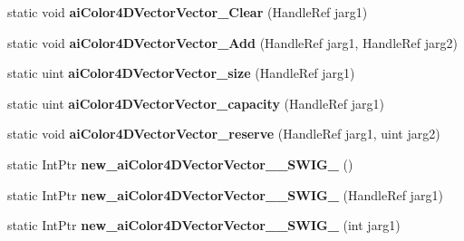\begin{DoxyCompactItemize}
\item 
\hypertarget{class_assimp_p_i_n_v_o_k_e_abc0c2b92adff071874c8415f9f302580}{static void {\bfseries ai\+Color4\+D\+Vector\+Vector\+\_\+\+Clear} (Handle\+Ref jarg1)}\label{class_assimp_p_i_n_v_o_k_e_abc0c2b92adff071874c8415f9f302580}

\item 
\hypertarget{class_assimp_p_i_n_v_o_k_e_a635f5de602db2133e8e3a4ac8884fe9e}{static void {\bfseries ai\+Color4\+D\+Vector\+Vector\+\_\+\+Add} (Handle\+Ref jarg1, Handle\+Ref jarg2)}\label{class_assimp_p_i_n_v_o_k_e_a635f5de602db2133e8e3a4ac8884fe9e}

\item 
\hypertarget{class_assimp_p_i_n_v_o_k_e_a831e99c08fa63c0bd46db32f5596163d}{static uint {\bfseries ai\+Color4\+D\+Vector\+Vector\+\_\+size} (Handle\+Ref jarg1)}\label{class_assimp_p_i_n_v_o_k_e_a831e99c08fa63c0bd46db32f5596163d}

\item 
\hypertarget{class_assimp_p_i_n_v_o_k_e_a56e1670afc099e29889e1e56e362882f}{static uint {\bfseries ai\+Color4\+D\+Vector\+Vector\+\_\+capacity} (Handle\+Ref jarg1)}\label{class_assimp_p_i_n_v_o_k_e_a56e1670afc099e29889e1e56e362882f}

\item 
\hypertarget{class_assimp_p_i_n_v_o_k_e_a30837ce6af17d9b24ce2ce0cb725a1b4}{static void {\bfseries ai\+Color4\+D\+Vector\+Vector\+\_\+reserve} (Handle\+Ref jarg1, uint jarg2)}\label{class_assimp_p_i_n_v_o_k_e_a30837ce6af17d9b24ce2ce0cb725a1b4}

\item 
\hypertarget{class_assimp_p_i_n_v_o_k_e_ae740462f251f4b41cfef8c0f577149a5}{static Int\+Ptr {\bfseries new\+\_\+ai\+Color4\+D\+Vector\+Vector\+\_\+\+\_\+\+S\+W\+I\+G\+\_} ()}\label{class_assimp_p_i_n_v_o_k_e_ae740462f251f4b41cfef8c0f577149a5}

\item 
\hypertarget{class_assimp_p_i_n_v_o_k_e_a33e9eae6a655850ae6a5ec9d1c23d547}{static Int\+Ptr {\bfseries new\+\_\+ai\+Color4\+D\+Vector\+Vector\+\_\+\+\_\+\+S\+W\+I\+G\+\_} (Handle\+Ref jarg1)}\label{class_assimp_p_i_n_v_o_k_e_a33e9eae6a655850ae6a5ec9d1c23d547}

\item 
\hypertarget{class_assimp_p_i_n_v_o_k_e_ad1902618ef306afd953cf49cca6ba1c2}{static Int\+Ptr {\bfseries new\+\_\+ai\+Color4\+D\+Vector\+Vector\+\_\+\+\_\+\+S\+W\+I\+G\+\_} (int jarg1)}\label{class_assimp_p_i_n_v_o_k_e_ad1902618ef306afd953cf49cca6ba1c2}


\end{DoxyCompactItemize}

